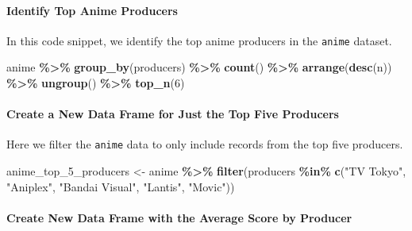 \documentclass[
]{book}
\newenvironment{Shaded}{\begin{snugshade}}{\end{snugshade}}
\newcommand{\DecValTok}[1]{\textcolor[rgb]{0.00,0.00,0.81}{#1}}
\newcommand{\FunctionTok}[1]{\textcolor[rgb]{0.13,0.29,0.53}{\textbf{#1}}}
\newcommand{\NormalTok}[1]{#1}
\newcommand{\OtherTok}[1]{\textcolor[rgb]{0.56,0.35,0.01}{#1}}
\newcommand{\SpecialCharTok}[1]{\textcolor[rgb]{0.81,0.36,0.00}{\textbf{#1}}}
\newcommand{\StringTok}[1]{\textcolor[rgb]{0.31,0.60,0.02}{#1}}
\begin{document}
\hypertarget{identify-top-anime-producers}{%
\paragraph*{Identify Top Anime Producers}\label{identify-top-anime-producers}}

In this code snippet, we identify the top anime producers in the \texttt{anime} dataset.

\begin{Shaded}
\begin{Highlighting}[]
\NormalTok{anime }\SpecialCharTok{\%\textgreater{}\%}
  \FunctionTok{group\_by}\NormalTok{(producers) }\SpecialCharTok{\%\textgreater{}\%}
  \FunctionTok{count}\NormalTok{() }\SpecialCharTok{\%\textgreater{}\%}
  \FunctionTok{arrange}\NormalTok{(}\FunctionTok{desc}\NormalTok{(n)) }\SpecialCharTok{\%\textgreater{}\%}
  \FunctionTok{ungroup}\NormalTok{() }\SpecialCharTok{\%\textgreater{}\%}
  \FunctionTok{top\_n}\NormalTok{(}\DecValTok{6}\NormalTok{)}
\end{Highlighting}
\end{Shaded}

\hypertarget{create-a-new-data-frame-for-just-the-top-five-producers}{%
\paragraph*{Create a New Data Frame for Just the Top Five Producers}\label{create-a-new-data-frame-for-just-the-top-five-producers}}

Here we filter the \texttt{anime} data to only include records from the top five producers.

\begin{Shaded}
\begin{Highlighting}[]
\NormalTok{anime\_top\_5\_producers }\OtherTok{\textless{}{-}}\NormalTok{ anime }\SpecialCharTok{\%\textgreater{}\%}
  \FunctionTok{filter}\NormalTok{(producers }\SpecialCharTok{\%in\%} \FunctionTok{c}\NormalTok{(}\StringTok{"TV Tokyo"}\NormalTok{, }\StringTok{"Aniplex"}\NormalTok{, }\StringTok{"Bandai Visual"}\NormalTok{, }\StringTok{"Lantis"}\NormalTok{, }\StringTok{"Movic"}\NormalTok{))}
\end{Highlighting}
\end{Shaded}

\hypertarget{create-new-data-frame-with-the-average-score-by-producer}{%
\paragraph*{Create New Data Frame with the Average Score by Producer}\label{create-new-data-frame-with-the-average-score-by-producer}}
\end{document}
